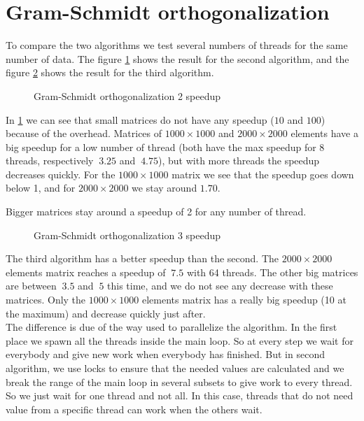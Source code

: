 \section{Gram-Schmidt orthogonalization}

To compare the two algorithms we test several numbers of threads for the same number of data. The figure \ref{fig:gram2} shows the result for the second algorithm, and the figure \ref{fig:gram3} shows the result for the third algorithm.\\

\begin{figure}[!h]
  \begin{center}
  \end{center}
  \caption{Gram-Schmidt orthogonalization 2 speedup}
  \label{fig:gram2}
\end{figure}

In \ref{fig:gram2} we can see that small matrices do not have any speedup ($10$ and $100$) because of the overhead.
Matrices of $1000\times 1000$ and  $2000\times 2000$ elements have a big speedup for a low number of thread (both have the max speedup for 8 threads, respectively $~3.25$ and $~4.75$), but with more threads the speedup decreases quickly. For the $1000\times 1000$ matrix we see that the speedup goes down below 1, and for $2000\times 2000$ we stay around $1.70$.

Bigger matrices stay around a speedup of 2 for any number of thread.\\

\begin{figure}[!h]
  \begin{center}
  \end{center}
  \caption{Gram-Schmidt orthogonalization 3 speedup}
  \label{fig:gram3}
\end{figure}

The third algorithm has a better speedup than the second. The $2000\times 2000$ elements matrix reaches a speedup of $~7.5$ with 64 threads. The other big matrices are between $~3.5$ and $~5$ this time, and we do not see any decrease with these matrices. Only the $1000\times 1000$ elements matrix has a really big speedup (10 at the maximum) and decrease quickly just after.\\

The difference is due of the way used to parallelize the algorithm.
In the first place we spawn all the threads inside the main loop.
So at every step we wait for everybody and give new work when everybody has finished.
But in second algorithm, we use locks to ensure that the needed values are calculated and we break the range of the main loop in several subsets to give work to every thread.
So we just wait for one thread and not all. In this case, threads that do not need value from a specific thread can work when the others wait.

